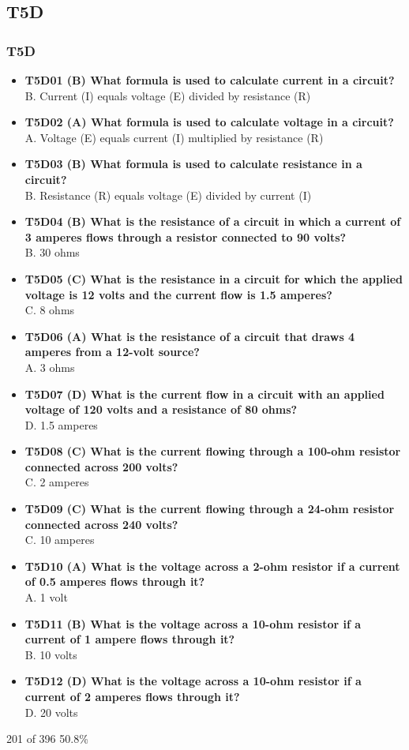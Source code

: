 \documentclass[10pt]{beamer}
\begin{document}
\subsection{T5D}
\begin{frame}
\frametitle{T5D}
\tiny
\begin{itemize}[<+->]
\item\textbf{T5D01 (B) What formula is used to calculate current in a circuit?}\\B. Current (I) equals voltage (E) divided by resistance (R)
\item\textbf{T5D02 (A) What formula is used to calculate voltage in a circuit?}\\A. Voltage (E) equals current (I) multiplied by resistance (R)
\item\textbf{T5D03 (B) What formula is used to calculate resistance in a circuit?}\\B. Resistance (R) equals voltage (E) divided by current (I)
\item\textbf{T5D04 (B) What is the resistance of a circuit in which a current of 3 amperes flows through a resistor connected to 90 volts?}\\B. 30 ohms
\item\textbf{T5D05 (C) What is the resistance in a circuit for which the applied voltage is 12 volts and the current flow is 1.5 amperes?}\\C. 8 ohms
\item\textbf{T5D06 (A) What is the resistance of a circuit that draws 4 amperes from a 12-volt source?}\\A. 3 ohms
\item\textbf{T5D07 (D) What is the current flow in a circuit with an applied voltage of 120 volts and a resistance of 80 ohms?}\\D. 1.5 amperes
\item\textbf{T5D08 (C) What is the current flowing through a 100-ohm resistor connected across 200 volts?}\\C. 2 amperes
\item\textbf{T5D09 (C) What is the current flowing through a 24-ohm resistor connected across 240 volts?}\\C. 10 amperes
\item\textbf{T5D10 (A) What is the voltage across a 2-ohm resistor if a current of 0.5 amperes flows through it?}\\A. 1 volt
\item\textbf{T5D11 (B) What is the voltage across a 10-ohm resistor if a current of 1 ampere flows through it?}\\B. 10 volts
\item\textbf{T5D12 (D) What is the voltage across a 10-ohm resistor if a current of 2 amperes flows through it?}\\D. 20 volts
\end{itemize}
\tiny 201 of 396  50.8\%
\end{frame}
\end{document}
